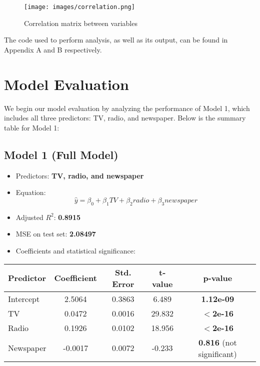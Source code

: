 \documentclass{article}
\begin{document}
\begin{figure}[h!]
    \centering
    \texttt{[image: images/correlation.png]}
    \caption{Correlation matrix between variables}
    \label{fig:enter-label}
\end{figure}

The code used to perform analysis, as well as its output, can be found in Appendix A and B respectively.


\section{Model Evaluation}

We begin our model evaluation by analyzing the performance of Model 1, which includes all three predictors: TV, radio, and newspaper. Below is the summary table for Model 1:

\subsection{Model 1 (Full Model)}
\begin{itemize}
    \item Predictors: \textbf{TV, radio, and newspaper}
    \item Equation:
    \begin{equation}
        \hat{y} = \beta_0 + \beta_1 TV + \beta_2 radio + \beta_3 newspaper
    \end{equation}
    \item Adjusted $ R^2 $: \textbf{0.8915}
    \item MSE on test set: \textbf{2.08497}
    \item Coefficients and statistical significance:
\end{itemize}

\begin{table}[h]
    \centering
    \begin{tabular}{lcccc}
        \toprule
        Predictor  & Coefficient & Std. Error & t-value & p-value \\
        \midrule
        Intercept  & 2.5064      & 0.3863     & 6.489   & \textbf{1.12e-09} \\
        TV         & 0.0472      & 0.0016     & 29.832  & \textbf{$<$2e-16} \\
        Radio      & 0.1926      & 0.0102     & 18.956  & \textbf{$<$2e-16} \\
        Newspaper  & -0.0017     & 0.0072     & -0.233  & \textbf{0.816} (not significant) \\
        \bottomrule
    \end{tabular}
\end{table}
\end{document}
